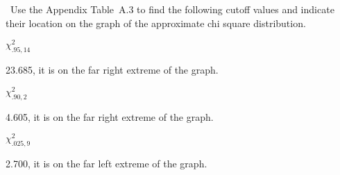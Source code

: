 \begin{problem}
  ~Use the Appendix Table~A.3 to find the following cutoff values and indicate their location on the graph of the approximate chi square distribution.
\end{problem}

\begin{subproblem}
  $\chi_{.95,14}^{2}$
\end{subproblem}

23.685, it is on the far right extreme of the graph.

\begin{subproblem}
  $\chi_{.90,2}^{2}$
\end{subproblem}

4.605, it is on the far right extreme of the graph.

\begin{subproblem}
  $\chi_{.025,9}^{2}$
\end{subproblem}

2.700, it is on the far left extreme of the graph.
